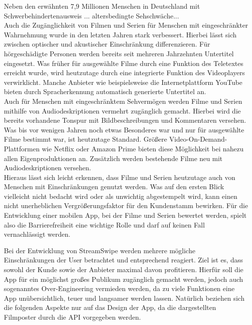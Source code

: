 Neben den erwähnten 7,9 Millionen Menschen in Deutschland mit Schwerbehindertenausweis ... altersbedingte Sehschwäche...\\


Auch die Zugänglichkeit von Filmen und Serien für Menschen mit eingeschränkter Wahrnehmung wurde in den letzten Jahren stark verbessert. 
Hierbei lässt sich zwischen optischer und akustischer Einschränkung differenzieren. Für hörgeschädigte Personen werden bereits seit mehreren Jahrzehnten Untertitel eingesetzt. Was früher für ausgewählte Filme durch eine Funktion des Teletextes erreicht wurde, wird heutzutage durch eine integrierte Funktion des Videoplayers verwirklicht. Manche Anbieter wie beispielsweise die Internetplattform YouTube bieten durch Spracherkennung automatisch generierte Untertitel an.\\
Auch für Menschen mit eingeschränktem Sehvermögen werden Filme und Serien mithilfe von Audiodeskriptionen vermehrt zugänglich gemacht. Hierbei wird die bereits vorhandene Tonspur mit Bildbeschreibungen und Kommentaren versehen. Was bis vor wenigen Jahren noch etwas Besonderes war und nur für ausgewählte Filme bestimmt war, ist heutzutage Standard. Größere Video-On-Demand-Plattformen wie Netflix oder Amazon Prime bieten diese Möglichkeit bei nahezu allen Eigenproduktionen an. Zusätzlich werden bestehende Filme neu mit Audiodeskriptionen versehen.\\


Hieraus lässt sich leicht erkennen, dass Filme und Serien heutzutage auch von Menschen mit Einschränkungen genutzt werden. Was auf den ersten Blick vielleicht nicht bedacht wird oder als  unwichtig abgestempelt wird, kann einen nicht unerheblichen Vergrößerungsfaktor für den Kundenstamm bewirken. Für die Entwicklung einer mobilen App, bei der Filme und Serien bewertet werden, spielt also die Barrierefreiheit eine wichtige Rolle und darf auf keinen Fall vernachlässigt werden. 


Bei der Entwicklung von StreamSwipe werden mehrere mögliche Einschränkungen der User betrachtet und entsprechend reagiert. Ziel ist es, dass sowohl der Kunde sowie der Anbieter maximal davon profitieren. Hierfür soll die App für ein möglichst großes Publikum zugänglich gemacht werden, jedoch auch sogenanntes Over-Engineering vermieden werden, da zu viele Funktionen eine App unübersichtlich, teuer und langsamer werden lassen. Natürlich beziehen sich die folgenden Aspekte nur auf das Design der App, da die dargestellten Filmposter durch die API vorgegeben werden.\\


